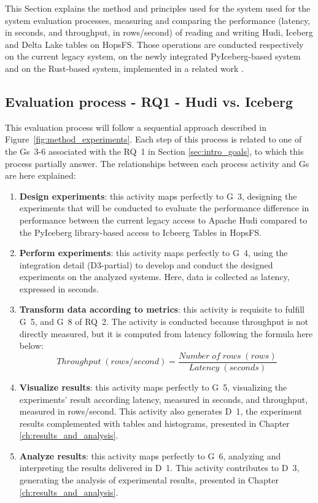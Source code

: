 This Section explains the method and principles used for the system used for the system evaluation processes, measuring and comparing the performance (latency, in seconds, and throughput, in rows/second) of reading and writing Hudi, Iceberg and Delta Lake tables on \gls{HopsFS}. Those operations are conducted respectively on the current legacy system, on the newly integrated PyIceberg-based system and on the Rust-based system, implemented in a related work \cite{manfrediReducingReadWrite2024}.

\subsection{Evaluation process - RQ1 - Hudi vs. Iceberg}
\label{subsec:system_eval_hudi_iceberg}
This evaluation process will follow a sequential approach described in Figure~\ref{fig:method_experiments}. Each step of this process is related to one of the \glspl{G}~3-6 associated with the \gls{RQ}~1 in Section \ref{sec:intro_goals}, to which this process partially answer. The relationships between each process activity and \glspl{G} are here explained:
\begin{enumerate}
    \item \textbf{Design experiments}: this activity maps perfectly to \gls{G}~3, designing the experiments that will be conducted to evaluate the performance difference in performance between the current legacy access to Apache Hudi compared to the PyIceberg library-based access to Icbeerg Tables in \gls{HopsFS}. 
    \item \textbf{Perform experiments}: this activity maps perfectly to \gls{G}~4, using the integration detail (\gls{D}3-partial) to develop and conduct the designed experiments on the analyzed systems. Here, data is collected as latency, expressed in seconds.
    \item \textbf{Transform data according to metrics}: this activity is requisite to fulfill \gls{G}~5, and \gls{G}~8 of \gls{RQ}~2. The activity is conducted because throughput is not directly measured, but it is computed from latency following the formula here below:
    \[ Throughput \; (rows/second) = \frac{Number \; of \; rows \; (rows)}{Latency \;(seconds)}\]
    \item \textbf{Visualize results}: this activity maps perfectly to \gls{G}~5, visualizing the experiments' result according latency, measured in seconds, and throughput, measured in rows/second. This activity also generates \gls{D}~1, the experiment results complemented with tables and histograms, presented in Chapter \ref{ch:results_and_analysis}.
    \item \textbf{Analyze results}: this activity maps perfectly to \gls{G}~6, analyzing and interpreting the results delivered in \gls{D}~1. This activity contributes to \gls{D}~3, generating the analysis of experimental results, presented in Chapter \ref{ch:results_and_analysis}.
\end{enumerate}
